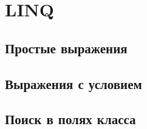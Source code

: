 \section{LINQ}

\subsection{Простые выражения}

\subsection{Выражения с условием}

\subsection{Поиск в полях класса}
